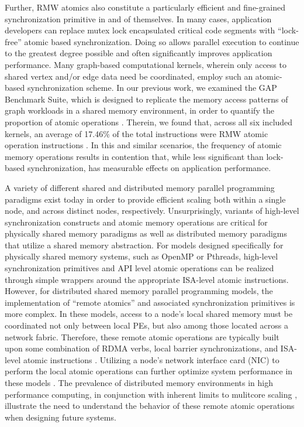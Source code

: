 Further, RMW atomics also constitute a particularly efficient and fine-grained synchronization primitive in and of themselves.
In many cases, application developers can replace mutex lock encapsulated critical code segments with ``lock-free'' atomic based synchronization.
Doing so allows parallel execution to continue to the greatest degree possible and often significantly improves application performance.
Many graph-based computational kernels, wherein only access to shared vertex and/or edge data need be coordinated, employ such an atomic-based synchronization scheme.
In our previous work, we examined the GAP Benchmark Suite, which is designed to replicate the memory access patterns of graph workloads in a shared memory environment, in order to quantify the proportion of atomic operations \cite{beamer2015gap}.
Therein, we found that, across all six included kernels, an average of 17.46\% of the total instructions were RMW atomic operation instructions \cite{rae}.
In this and similar scenarios, the frequency of atomic memory operations results in contention that, while less significant than lock-based synchronization, has measurable effects on application performance.

A variety of different shared and distributed memory parallel programming paradigms exist today in order to provide efficient scaling both within a single node, and across distinct nodes, respectively.
Unsurprisingly, variants of high-level synchronization constructs and atomic memory operations are critical for physically shared memory paradigms as well as distributed memory paradigms that utilize a shared memory abstraction.
For models designed specifically for physically shared memory systems, such as OpenMP or Pthreads, high-level synchronization primitives and API level atomic operations can be realized through simple wrappers around the appropriate ISA-level atomic instructions.
However, for distributed shared memory parallel programming models, the implementation of ``remote atomics'' and associated synchronization primitives is more complex.
In these models, access to a node's local shared memory must be coordinated not only between local PEs, but also among those located across a network fabric.
Therefore, these remote atomic operations are typically built upon some combination of RDMA verbs, local barrier synchronizations, and ISA-level atomic instructions \cite{chen2017rdmahtm}\cite{kalia2016rdmadesign}.
Utilizing a node's network interface card (NIC) to perform the local atomic operations can further optimize system performance in these models \cite{rae}.
The prevalence of distributed memory environments in high performance computing, in conjunction with inherent limits to mulitcore scaling \cite{esmaeilzadeh2011silicon}, illustrate the need to understand the behavior of these remote atomic operations when designing future systems.

